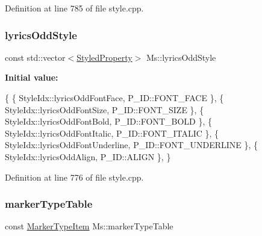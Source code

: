 Definition at line 785 of file style.\+cpp.

\mbox{\label{namespace_ms_a12ed52992b62d5002526f47b575471cb}} 
\subsubsection{\texorpdfstring{lyrics\+Odd\+Style}{lyricsOddStyle}}
{\footnotesize\ttfamily const std\+::vector$<$\hyperlink{struct_ms_1_1_styled_property}{Styled\+Property}$>$ Ms\+::lyrics\+Odd\+Style}

{\bfseries Initial value\+:}
\begin{DoxyCode}
\{
      \{ StyleIdx::lyricsOddFontFace,                  P\_ID::FONT\_FACE              \},
      \{ StyleIdx::lyricsOddFontSize,                  P\_ID::FONT\_SIZE              \},
      \{ StyleIdx::lyricsOddFontBold,                  P\_ID::FONT\_BOLD              \},
      \{ StyleIdx::lyricsOddFontItalic,                P\_ID::FONT\_ITALIC            \},
      \{ StyleIdx::lyricsOddFontUnderline,             P\_ID::FONT\_UNDERLINE         \},
      \{ StyleIdx::lyricsOddAlign,                     P\_ID::ALIGN                  \},
      \}
\end{DoxyCode}


Definition at line 776 of file style.\+cpp.

\mbox{\label{namespace_ms_a0bb99807ec4e278c6218609833683ea3}} 
\subsubsection{\texorpdfstring{marker\+Type\+Table}{markerTypeTable}}
{\footnotesize\ttfamily const \hyperlink{struct_ms_1_1_marker_type_item}{Marker\+Type\+Item} Ms\+::marker\+Type\+Table}

